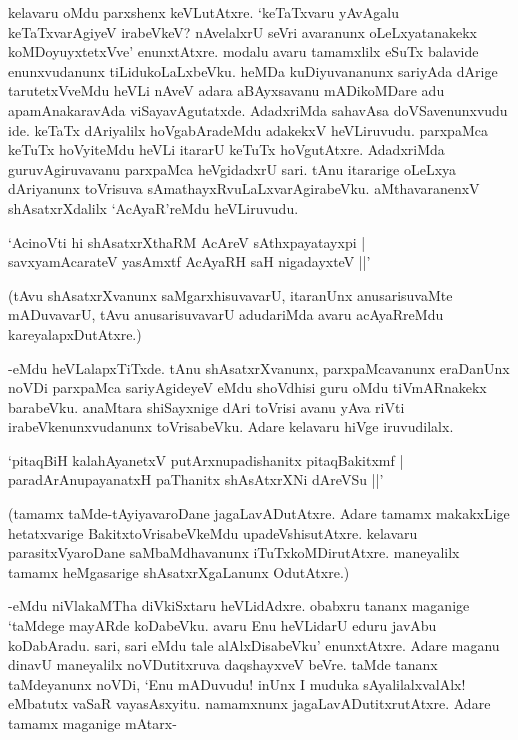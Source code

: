 kelavaru oMdu parxshenx keVLutAtxre. `keTaTxvaru yAvAgalu keTaTxvarAgiyeV irabeVkeV? nAvelalxrU seVri avaranunx oLeLxyatanakekx koMDoyuyxtetxVve' enunxtAtxre. modalu avaru tamamxlilx eSuTx balavide enunxvudanunx tiLidukoLaLxbeVku. heMDa kuDiyuvananunx sariyAda dArige tarutetxVveMdu heVLi nAveV adara aBAyxsavanu mADikoMDare adu apamAnakaravAda viSayavAgutatxde. AdadxriMda sahavAsa doVSavenunxvudu ide. keTaTx dAriyalilx hoVgabAradeMdu adakekxV heVLiruvudu. parxpaMca keTuTx hoVyiteMdu heVLi itararU keTuTx hoVgutAtxre. AdadxriMda guruvAgiruvavanu parxpaMca heVgidadxrU sari. tAnu itararige oLeLxya dAriyanunx toVrisuva sAmathayxRvuLaLxvarAgirabeVku. aMthavaranenxV shAsatxrXdalilx `AcAyaR'reMdu heVLiruvudu. 

\begin{shloka} 
`AcinoVti hi shAsatxrXthaRM AcAreV sAthxpayatayxpi |\\
savxyamAcarateV yasAmxtf AcAyaRH saH nigadayxteV ||'
\end{shloka}

(tAvu shAsatxrXvanunx saMgarxhisuvavarU, itaranUnx anusarisuvaMte mADuvavarU, tAvu anusarisuvavarU adudariMda avaru acAyaRreMdu kareyalapxDutAtxre.)

-eMdu heVLalapxTiTxde. tAnu shAsatxrXvanunx, parxpaMcavanunx eraDanUnx noVDi parxpaMca sariyAgideyeV eMdu shoVdhisi guru oMdu tiVmARnakekx barabeVku. anaMtara shiSayxnige dAri toVrisi avanu yAva riVti irabeVkenunxvudanunx toVrisabeVku. Adare kelavaru hiVge iruvudilalx. 


\begin{shloka}
`pitaqBiH kalahAyanetxV putArxnupadishanitx pitaqBakitxmf |\\
paradArAnupayanatxH paThanitx shAsAtxrXNi dAreVSu ||'
\end{shloka}

(tamamx taMde-tAyiyavaroDane jagaLavADutAtxre. Adare tamamx makakxLige hetatxvarige BakitxtoVrisabeVkeMdu upadeVshisutAtxre. kelavaru parasitxVyaroDane saMbaMdhavanunx iTuTxkoMDirutAtxre. maneyalilx tamamx heMgasarige shAsatxrXgaLanunx OdutAtxre.)

-eMdu niVlakaMTha diVkiSxtaru heVLidAdxre. obabxru tananx maganige `taMdege mayARde koDabeVku. avaru Enu heVLidarU eduru javAbu koDabAradu. sari, sari eMdu tale alAlxDisabeVku' enunxtAtxre. Adare maganu dinavU maneyalilx noVDutitxruva daqshayxveV beVre. taMde tananx taMdeyanunx noVDi, `Enu mADuvudu! inUnx I muduka sAyalilalxvalAlx! eMbatutx vaSaR vayasAsxyitu. namamxnunx jagaLavADutitxrutAtxre. Adare tamamx maganige mAtarx-

